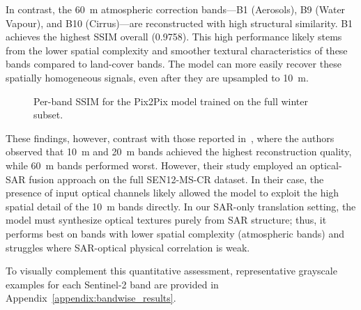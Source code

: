 In contrast, the 60~m atmospheric correction bands—B1 (Aerosols), B9 (Water Vapour), and B10 (Cirrus)—are reconstructed with high structural similarity. B1 achieves the highest SSIM overall (0.9758). This high performance likely stems from the lower spatial complexity and smoother textural characteristics of these bands compared to land-cover bands. The model can more easily recover these spatially homogeneous signals, even after they are upsampled to 10~m.


\begin{figure}[!htbp]
\centering
{}
\caption[Per-band SSIM for the Pix2Pix model]{Per-band SSIM for the Pix2Pix model trained on the full winter subset.}
\label{fig:ssim_per_band}
\end{figure}

These findings, however, contrast with those reported in~\cite{CR_SEN2_dRNN}, where the authors observed that 10~m and 20~m bands achieved the highest reconstruction quality, while 60~m bands performed worst. However, their study employed an optical-SAR fusion approach on the full SEN12-MS-CR dataset. In their case, the presence of input optical channels likely allowed the model to exploit the high spatial detail of the 10~m bands directly. In our SAR-only translation setting, the model must synthesize optical textures purely from SAR structure; thus, it performs best on bands with lower spatial complexity (atmospheric bands) and struggles where SAR-optical physical correlation is weak.

To visually complement this quantitative assessment, representative grayscale examples for each Sentinel-2 band are provided in Appendix~\ref{appendix:bandwise_results}.


